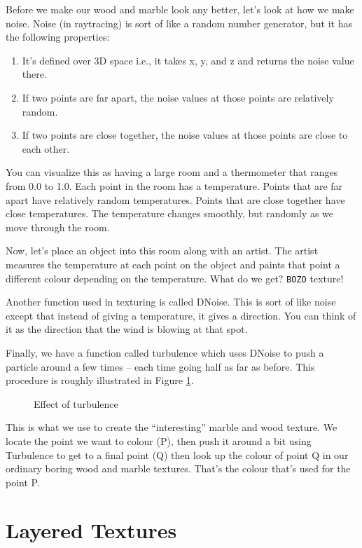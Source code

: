 Before we make our wood and marble look any better, let's look at how we make
noise.  Noise (in raytracing) is sort of like a random
number generator, but
it has the following properties:
\begin{enumerate}
\item It's defined over 3D space i.e., it takes x, y, and z and returns the
noise value there.
\item If two points are far apart, the noise values at those points are
relatively random.
\item If two points are close together, the noise values at those points are
close to each other.
\end{enumerate}
You can visualize this as having a large room and a thermometer that ranges
from 0.0 to 1.0.  Each point in the room has a temperature.  Points that are
far apart have relatively random temperatures.  Points that are close together
have close temperatures. The temperature changes smoothly, but randomly as we
move through the room.

Now, let's place an object into this room along with an artist.  The artist
measures the temperature at each point on the object and paints that point a
different colour depending on the temperature.  What do we get?
{\tt BOZO} texture!

Another function used in texturing is called DNoise.  This is sort of like
noise except that instead of giving a temperature, it gives a direction.  You
can think of it as the direction that the wind is blowing at that spot.

Finally, we have a function called turbulence which
uses DNoise to push a particle around a few times -- each time going
half as far as before. This procedure is roughly illustrated in
Figure \ref{turb}.
\begin{figure}[htbp]
\begin{centering}

\caption{Effect of turbulence}
\label{turb}
\end{centering}
\end{figure}
This is what we use to create the ``interesting'' marble and wood texture.  We
locate the point we want to colour (P), then push it around a bit using
Turbulence to get to a final point (Q) then look up the colour of point Q in
our ordinary boring wood and marble textures.  That's the colour that's used
for the point P.

\section{Layered Textures}

